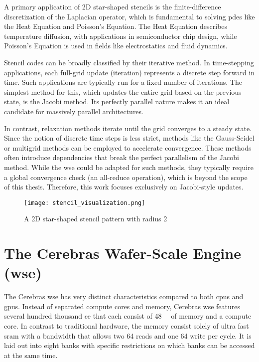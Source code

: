A primary application of 2D star-shaped stencils is the finite-difference discretization of the Laplacian operator, which is fundamental to solving \acp{pde} like the Heat Equation and Poisson's Equation. The Heat Equation describes temperature diffusion, with applications in semiconductor chip design, while Poisson's Equation is used in fields like electrostatics and fluid dynamics.

Stencil codes can be broadly classified by their iterative method. In time-stepping applications, each full-grid update (iteration) represents a discrete step forward in time. Such applications are typically run for a fixed number of iterations. The simplest method for this, which updates the entire grid based on the previous state, is the Jacobi method. Its perfectly parallel nature makes it an ideal candidate for massively parallel architectures.

In contrast, relaxation methods iterate until the grid converges to a steady state. Since the notion of discrete time steps is less strict, methods like the Gauss-Seidel or multigrid methods can be employed to accelerate convergence. These methods often introduce dependencies that break the perfect parallelism of the Jacobi method. While the \ac{wse} could be adapted for such methods, they typically require a global convergence check (an all-reduce operation), which is beyond the scope of this thesis. Therefore, this work focuses exclusively on Jacobi-style updates.

\begin{figure}[h]
    \centering
    \texttt{[image: stencil\_visualization.png]}
    \caption{A 2D star-shaped stencil pattern with radius 2}
    \label{fig:stencil_visualization}
\end{figure}

\section{The Cerebras Wafer-Scale Engine (\ac{wse})}
The Cerebras \ac{wse} has very distinct characteristics compared to both \acp{cpu} and \acp{gpu}.
Instead of separated compute cores and memory, Cerebras \ac{wse} features several hundred thousand \ac{ce} that each consist of \qty{48}{\kilo\byte} of memory and a compute core. In contrast to traditional hardware, the memory consist solely of ultra fast \ac{sram} with a bandwidth that allows two \qty{64}{\bit} reads and one \qty{64}{\bit} write per cycle. It is laid out into eight banks with specific restrictions on which banks can be accessed at the same time.


